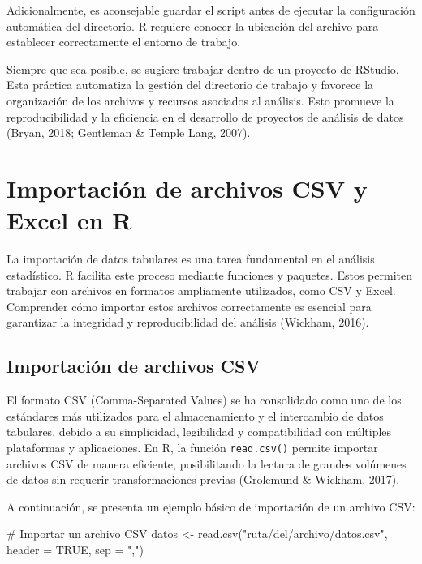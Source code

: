 \documentclass[
  spanish,
  a4paper,
  DIV=11,
  numbers=noendperiod,
  onepage,
  openany]{scrreprt}
\newenvironment{Shaded}{\begin{snugshade}}{\end{snugshade}}
\newcommand{\AttributeTok}[1]{\textcolor[rgb]{0.40,0.45,0.13}{#1}}
\newcommand{\CommentTok}[1]{\textcolor[rgb]{0.37,0.37,0.37}{#1}}
\newcommand{\ConstantTok}[1]{\textcolor[rgb]{0.56,0.35,0.01}{#1}}
\newcommand{\FunctionTok}[1]{\textcolor[rgb]{0.28,0.35,0.67}{#1}}
\newcommand{\NormalTok}[1]{\textcolor[rgb]{0.00,0.23,0.31}{#1}}
\newcommand{\OtherTok}[1]{\textcolor[rgb]{0.00,0.23,0.31}{#1}}
\newcommand{\StringTok}[1]{\textcolor[rgb]{0.13,0.47,0.30}{#1}}
\begin{document}
Adicionalmente, es aconsejable guardar el script antes de ejecutar la
configuración automática del directorio. R requiere conocer la ubicación
del archivo para establecer correctamente el entorno de trabajo.

Siempre que sea posible, se sugiere trabajar dentro de un proyecto de
RStudio. Esta práctica automatiza la gestión del directorio de trabajo y
favorece la organización de los archivos y recursos asociados al
análisis. Esto promueve la reproducibilidad y la eficiencia en el
desarrollo de proyectos de análisis de datos (Bryan, 2018; Gentleman \&
Temple Lang, 2007).

\section{Importación de archivos CSV y Excel en
R}\label{importaciuxf3n-de-archivos-csv-y-excel-en-r}

La importación de datos tabulares es una tarea fundamental en el
análisis estadístico. R facilita este proceso mediante funciones y
paquetes. Estos permiten trabajar con archivos en formatos ampliamente
utilizados, como CSV y Excel. Comprender cómo importar estos archivos
correctamente es esencial para garantizar la integridad y
reproducibilidad del análisis (Wickham, 2016).

\subsection{Importación de archivos
CSV}\label{importaciuxf3n-de-archivos-csv}

El formato CSV (Comma-Separated Values) se ha consolidado como uno de
los estándares más utilizados para el almacenamiento y el intercambio de
datos tabulares, debido a su simplicidad, legibilidad y compatibilidad
con múltiples plataformas y aplicaciones. En R, la función
\texttt{read.csv()} permite importar archivos CSV de manera eficiente,
posibilitando la lectura de grandes volúmenes de datos sin requerir
transformaciones previas (Grolemund \& Wickham, 2017).

A continuación, se presenta un ejemplo básico de importación de un
archivo CSV:

\begin{Shaded}
\begin{Highlighting}[]
\CommentTok{\# Importar un archivo CSV}
\NormalTok{datos }\OtherTok{\textless{}{-}} \FunctionTok{read.csv}\NormalTok{(}\StringTok{"ruta/del/archivo/datos.csv"}\NormalTok{, }
                  \AttributeTok{header =} \ConstantTok{TRUE}\NormalTok{, }
                  \AttributeTok{sep =} \StringTok{","}\NormalTok{)}
\end{Highlighting}
\end{Shaded}
\end{document}
